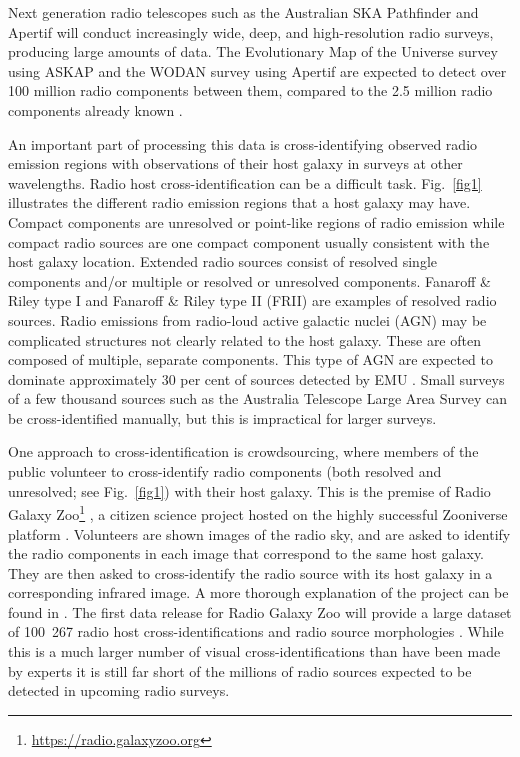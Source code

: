 \documentclass[fleqn,usenatbib,usedcolumn]{mnras}
\begin{document}
  Next generation radio telescopes such as the Australian SKA Pathfinder
  \citep[ASKAP;][]{johnston07} and Apertif \citep{verheijen08} will conduct
  increasingly wide, deep, and high-resolution radio surveys, producing large
  amounts of data. The Evolutionary Map of the Universe survey
  \citep[EMU;][]{norris11} using ASKAP and the WODAN survey \citep{rottgering11}
  using Apertif are expected to detect over 100 million radio components between
  them, compared to the 2.5 million radio components already known
  \citep{banfield15}.

  An important part of processing this data is cross-identifying observed radio
  emission regions with observations of their host galaxy in surveys at other
  wavelengths. Radio host cross-identification can be a difficult task. Fig.~\ref{fig1} illustrates the different radio emission regions that a host galaxy may have. Compact components are unresolved or point-like regions of radio emission while compact radio sources are one compact component usually consistent with the host galaxy location. Extended radio sources consist of resolved single components and/or multiple or resolved or unresolved components. Fanaroff \& Riley type I \citep[FRI; ][]{Fanaroff1974} and Fanaroff \& Riley type II (FRII) are examples of resolved radio sources.
  Radio emissions from radio-loud active galactic nuclei (AGN) may be
  complicated structures not clearly related to the host galaxy. These are often
  composed of multiple, separate components. This type of AGN are expected to dominate
  approximately 30 per cent of sources detected by EMU \citep{norris11}. Small surveys
  of a few thousand sources such as the Australia Telescope Large Area Survey
  \citep[ATLAS;][]{norris06,middelberg08} can be cross-identified manually, but
  this is impractical for larger surveys.

  One approach to cross-identification is crowdsourcing, where members of the
  public volunteer to cross-identify radio components (both resolved and unresolved; see Fig.~\ref{fig1}) with their host
  galaxy. This is the premise of Radio Galaxy Zoo\footnote{\url{https://radio.galaxyzoo.org}} \citep{banfield15},
  a citizen science project hosted on the highly successful Zooniverse platform
  \citep{lintott08}. Volunteers are shown images of the radio sky, and are asked
  to identify the radio components in each image that correspond to the same host galaxy. They are then asked to cross-identify the radio source with its host galaxy in a corresponding infrared image. A more thorough explanation of the project can be found in \citet{banfield15}. The first data release for Radio Galaxy Zoo will
  provide a large dataset of 100~267 radio host cross-identifications and radio
  source morphologies \citep{wong17}. While this is a much larger number of visual
  cross-identifications than have been made by experts \citep[i.e., ][]{Taylor2007,Gendre2008,Grant2010,norris06,middelberg08} it is still far short of
  the millions of radio sources expected to be detected in upcoming radio
  surveys.
\end{document}
